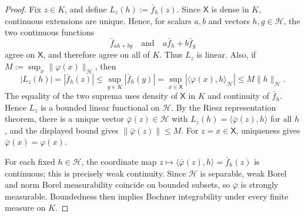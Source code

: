 \documentclass[11pt]{article}
\newcommand{\X}{\mathsf{X}}
\theoremstyle{definition}
\theoremstyle{definition}
\begin{document}
\begin{proof}
Fix \(z\in K\), and define \(L_z(h):=\bar f_h(z)\).  
Since \(\X\) is dense in \(K\), continuous extensions are unique.  Hence, for scalars \(a,b\) and vectors \(h,g\in\mathcal H\), the two continuous functions
\[
  \bar f_{ah+bg}
  \quad\text{and}\quad
  a\bar f_h+b\bar f_g
\]
agree on \(\X\), and therefore agree on all of \(K\).  Thus \(L_z\) is linear.  Also, if \(M:=\sup_x\|\varphi(x)\|_{\mathcal H}\), then
\[
  |L_z(h)|=|\bar f_h(z)|
  \le \sup_{y\in K}|\bar f_h(y)|
  = \sup_{x\in\X}|\langle\varphi(x),h\rangle_{\mathcal H}|
  \le M\|h\|_{\mathcal H}.
\]
The equality of the two suprema uses density of \(\X\) in \(K\) and continuity of \(\bar f_h\).  Hence \(L_z\) is a bounded linear functional on \(\mathcal H\).  By the Riesz representation theorem, there is a unique vector \(\bar\varphi(z)\in\mathcal H\) with \(L_z(h)=\langle\bar\varphi(z),h\rangle\) for all \(h\), and the displayed bound gives \(\|\bar\varphi(z)\|\le M\).  For \(z=x\in\X\), uniqueness gives \(\bar\varphi(x)=\varphi(x)\).

For each fixed \(h\in\mathcal H\), the coordinate map \(z\mapsto\langle\bar\varphi(z),h\rangle=\bar f_h(z)\) is continuous; this is precisely weak continuity.  Since \(\mathcal H\) is separable, weak Borel and norm Borel measurability coincide on bounded subsets, so \(\bar\varphi\) is strongly measurable.  Boundedness then implies Bochner integrability under every finite measure on \(K\).
\end{proof}
\end{document}
